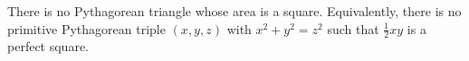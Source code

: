 There is no Pythagorean triangle whose area is a square. Equivalently, there is no primitive Pythagorean triple $(x, y, z)$ with $x^2 + y^2 = z^2$ such that $\frac{1}{2}xy$ is a perfect square.
